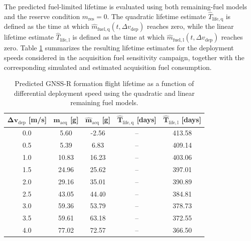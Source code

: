 The predicted fuel-limited lifetime is evaluated using both remaining-fuel models and the reserve condition $m_{\mathrm{res}}=0$. The quadratic lifetime estimate $\hat{T}_{\mathrm{life,q}}$ is defined as the time at which $\hat{m}_{\mathrm{fuel,q}}(t,\Delta v_{\mathrm{dep}})$ reaches zero, while the linear lifetime estimate $\hat{T}_{\mathrm{life,l}}$ is defined as the time at which $\hat{m}_{\mathrm{fuel,l}}(t,\Delta v_{\mathrm{dep}})$ reaches zero. Table \ref{tab:gnssr_lifetime_prediction_summary} summarizes the resulting lifetime estimates for the deployment speeds considered in the acquisition fuel sensitivity campaign, together with the corresponding simulated and estimated acquisition fuel consumption.
\begin{table}[H]
\centering
\caption{Predicted GNSS-R formation flight lifetime as a function of differential deployment speed using the quadratic and linear remaining fuel models.}
\label{tab:gnssr_lifetime_prediction_summary}
\begin{tabular}{ccccc}
\toprule
$\boldsymbol{\Delta v_{\mathrm{dep}}}$ \textbf{[m/s]} &
$\boldsymbol{m_{\mathrm{acq}}}$ \textbf{[g]} &
$\boldsymbol{\hat{m}_{\mathrm{acq}}}$ \textbf{[g]} &
$\boldsymbol{\hat{T}_{\mathrm{life,q}}}$ \textbf{[days]} &
$\boldsymbol{\hat{T}_{\mathrm{life,l}}}$ \textbf{[days]} \\
\midrule
0.0 & 5.60  & -2.56 & -- & 413.58 \\
0.5 & 5.39  & 6.83 & -- & 409.14 \\
1.0 & 10.83 & 16.23 & -- & 403.06 \\
1.5 & 24.96 & 25.62 & -- & 397.01 \\
2.0 & 29.16 & 35.01 & -- & 390.89 \\
2.5 & 43.05 & 44.40 & -- & 384.81 \\
3.0 & 59.36 & 53.79 & -- & 378.73 \\
3.5 & 59.61 & 63.18 & -- & 372.55 \\
4.0 & 77.02 & 72.57 & -- & 366.50 \\
\bottomrule
\end{tabular}
\end{table}

